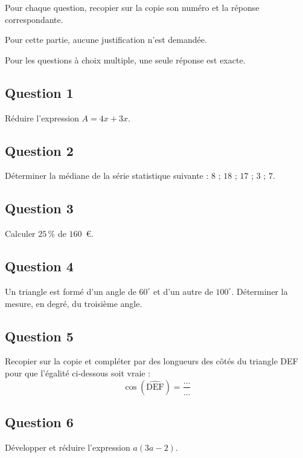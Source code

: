 Pour chaque question, recopier sur la copie son numéro et la réponse correspondante.

Pour cette partie, aucune justification n'est demandée.

Pour les questions à choix multiple, une seule réponse est exacte.

\subsection*{Question 1}
Réduire l'expression $A = 4x + 3x$.

\subsection*{Question 2}
Déterminer la médiane de la série statistique suivante : $8$ ; $18$ ; $17$ ; $3$ ; $7$.

\subsection*{Question 3}
Calculer $25\,\%$ de $160$~\euro.

\subsection*{Question 4}
Un triangle est formé d'un angle de $60^{\circ}$ et d'un autre de $100^{\circ}$. Déterminer la mesure, en degré, du troisième angle.

\subsection*{Question 5}
\begin{minipage}{0.63\linewidth}
Recopier sur la copie et compléter par des longueurs des côtés du triangle DEF pour que l'égalité ci-dessous soit vraie :
\[\cos\left(\widehat{\mathrm{DEF}}\right) = \dfrac{\dots}{\dots}\]
\end{minipage}\hfill
{}

\subsection*{Question 6}
Développer et réduire l'expression $a(3a - 2)$.

